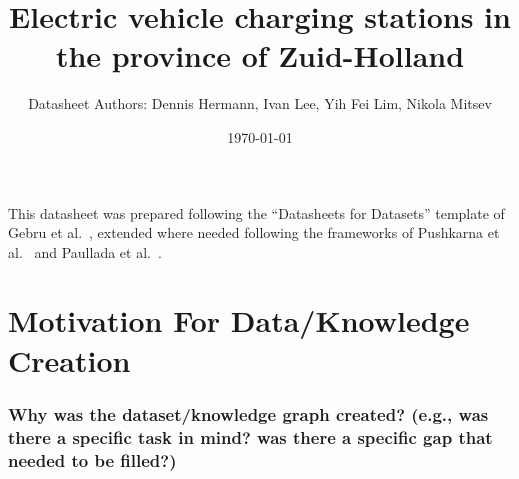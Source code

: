 \documentclass{article}
\title{Electric vehicle charging stations in the province of Zuid-Holland}
\author{Datasheet Authors: Dennis Hermann, Ivan Lee, Yih Fei Lim, Nikola Mitsev}
\newcommand{\question}[1]{#1}
\begin{document}
\date{\today}
\maketitle

This datasheet was prepared following the ``Datasheets for Datasets'' template of Gebru et al.\ \cite{gebru}, extended where needed following the frameworks of Pushkarna et al.\ \cite{pushkarna} and Paullada et al.\ \cite{Paullada}.

\section{Motivation For Data/Knowledge Creation}

\question{\subsubsection*{Why was the dataset/knowledge graph created? (e.g., was there a specific task in mind? was there a specific gap that needed to
		be filled?)}}
\end{document}
